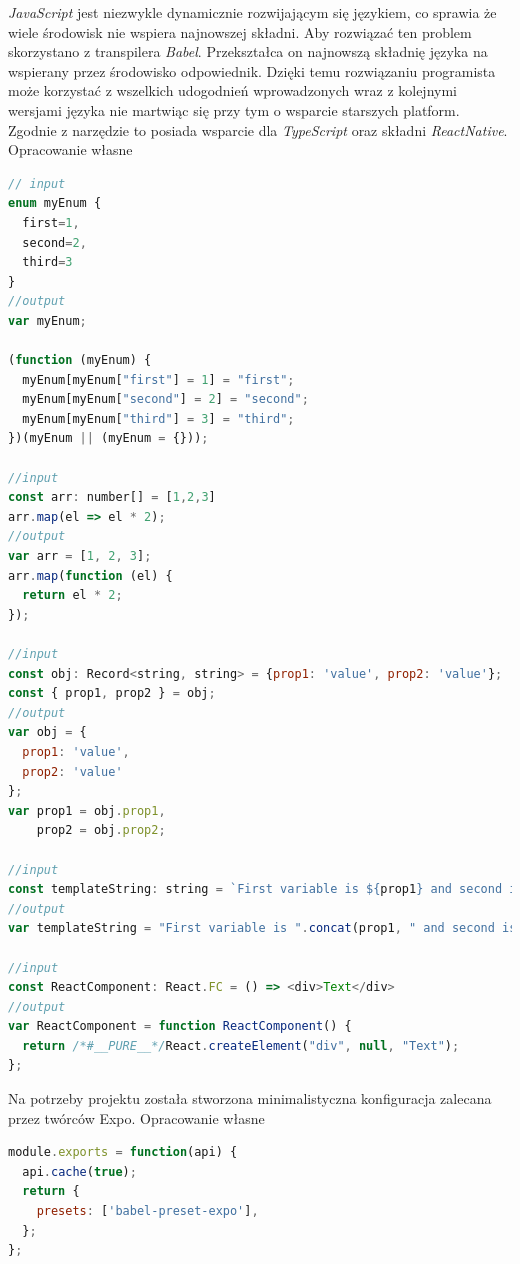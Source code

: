 \documentclass[skorowidz,skroty]{dyplomWEZUT}
\begin{document}
\textit{JavaScript} jest niezwykle dynamicznie rozwijającym się językiem, co sprawia że wiele środowisk nie wspiera najnowszej składni. Aby rozwiązać ten problem skorzystano z transpilera \textit{Babel}. Przekształca on najnowszą składnię języka na wspierany przez środowisko odpowiednik. Dzięki temu rozwiązaniu programista może korzystać z wszelkich udogodnień wprowadzonych wraz z kolejnymi wersjami języka nie martwiąc się przy tym o wsparcie starszych platform. Zgodnie z \cite{Babel} narzędzie to posiada wsparcie dla \textit{TypeScript} oraz składni \textit{ReactNative}.  
{Opracowanie własne}{\label{code: babel}}
\begin{lstlisting}[language=JavaScript]
// input
enum myEnum {
  first=1,
  second=2,
  third=3
}
//output 
var myEnum;

(function (myEnum) {
  myEnum[myEnum["first"] = 1] = "first";
  myEnum[myEnum["second"] = 2] = "second";
  myEnum[myEnum["third"] = 3] = "third";
})(myEnum || (myEnum = {}));

//input 
const arr: number[] = [1,2,3]
arr.map(el => el * 2);
//output 
var arr = [1, 2, 3];
arr.map(function (el) {
  return el * 2;
});

//input 
const obj: Record<string, string> = {prop1: 'value', prop2: 'value'};
const { prop1, prop2 } = obj;
//output 
var obj = {
  prop1: 'value',
  prop2: 'value'
};
var prop1 = obj.prop1,
    prop2 = obj.prop2;    
    
//input
const templateString: string = `First variable is ${prop1} and second is ${prop2}`;
//output
var templateString = "First variable is ".concat(prop1, " and second is ").concat(prop2);

//input
const ReactComponent: React.FC = () => <div>Text</div>
//output
var ReactComponent = function ReactComponent() {
  return /*#__PURE__*/React.createElement("div", null, "Text");
};

\end{lstlisting}
Na potrzeby projektu została stworzona minimalistyczna konfiguracja zalecana przez twórców Expo. 
{Opracowanie własne}{\label{code: babel config}}
\begin{lstlisting}[language=JavaScript]
module.exports = function(api) {
  api.cache(true);
  return {
    presets: ['babel-preset-expo'],
  };
};
\end{lstlisting}
\end{document}
